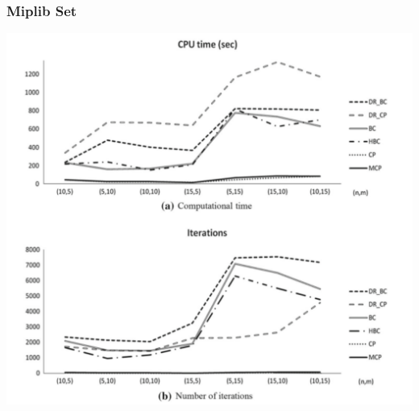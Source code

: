 \documentclass[11pt]{beamer}
\begin{document}
\begin{frame}
	\frametitle{Miplib Set}
\centering
\includegraphics[height=0.8\textheight]{run-times.pdf}
\end{frame}
\end{document}
